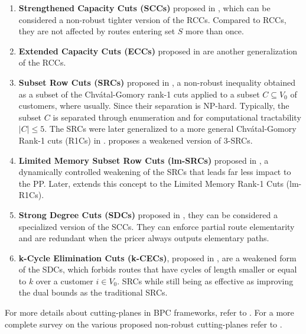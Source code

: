 \begin{enumerate}
	\setlength{\itemsep}{0pt}
	\setlength{\parskip}{0pt}

	\item \textbf{Strengthened Capacity Cuts (SCCs)} proposed in \textcite{baldacci2008},
	      which can be considered a non-robust tighter version of the RCCs.
	      Compared to RCCs, they are not affected by routes entering set $S$ more than once.
	\item \textbf{Extended Capacity Cuts (ECCs)} proposed in \textcite{pessoa2008, pessoa2009}
	      are another generalization of the RCCs.
	\item \textbf{Subset Row Cuts (SRCs)} proposed in \textcite{jepsen2008a}, a non-robust
	      inequality obtained as a subset of the  Chv\'atal-Gomory rank-1 cuts \parencite{chvatal1973}
	      applied to a subset $C \subseteq V_0$ of customers, where usually.
	      Since their separation is NP-hard.
	      Typically, the subset $C$ is separated through enumeration and for computational tractability
	      $|C| \le 5$.
	      The SRCs were later generalized to a more general Chv\'atal-Gomory Rank-1 cuts (R1Cs) in \textcite{petersen2008}.
	      \textcite{baldacci2001} proposes a weakened version of 3-SRCs.
	\item \textbf{Limited Memory Subset Row Cuts (lm-SRCs)} proposed in \textcite{pecin2017},
	      a dynamically controlled weakening of the SRCs that leads far less impact to
	      the PP.
	      Later, \textcite{pecin2017a} extends this concept to the Limited Memory Rank-1 Cuts (lm-R1Cs).
	\item \textbf{Strong Degree Cuts (SDCs)} proposed in \textcite{contardo2011, contardo2014}, they can be considered
	      a specialized version of the SCCs.
	      They can enforce partial route elementarity and are redundant
	      when the pricer always outputs elementary paths.
	\item \textbf{k-Cycle Elimination Cuts (k-CECs)}, proposed in \textcite{contardo2014},
	      are a weakened form of the SDCs, which forbids
	      routes that have cycles of length smaller or equal to $k$ over a customer $i \in V_0$.
	      SRCs while still being as effective as improving the dual bounds as the traditional SRCs.
\end{enumerate}


For more details about cutting-planes in BPC frameworks,
refer to \textcite{desaulniers2011}.
For a more complete survey on the various proposed non-robust cutting-planes
refer to \textcite{costa2019}.


